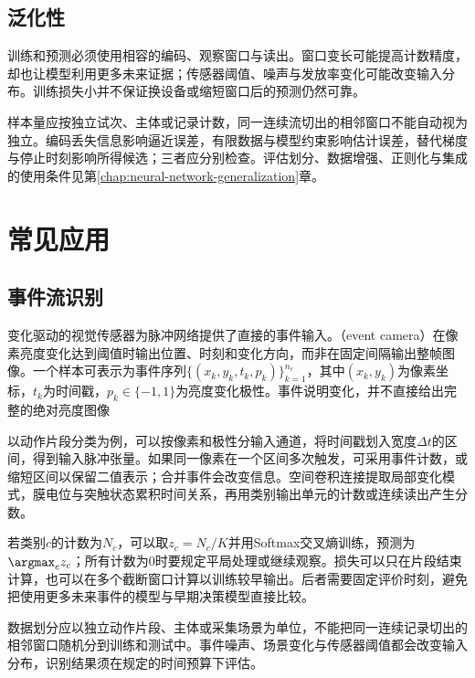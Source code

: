\subsection{泛化性}
\label{sec:snn-generalization}

训练和预测必须使用相容的编码、观察窗口与读出。窗口变长可能提高计数精度，却也让模型利用更多未来证据；传感器阈值、噪声与发放率变化可能改变输入分布。训练损失小并不保证换设备或缩短窗口后的预测仍然可靠。

样本量应按独立试次、主体或记录计数，同一连续流切出的相邻窗口不能自动视为独立。编码丢失信息影响逼近误差，有限数据与模型约束影响估计误差，替代梯度与停止时刻影响所得候选；三者应分别检查。评估划分、数据增强、正则化与集成的使用条件见第\ref{chap:neural-network-generalization}章。

\section{常见应用}
\label{sec:snn-applications}

\subsection{事件流识别}
\label{sec:snn-event-recognition}

变化驱动的视觉传感器为脉冲网络提供了直接的事件输入。（event camera）在像素亮度变化达到阈值时输出位置、时刻和变化方向，而非在固定间隔输出整帧图像。一个样本可表示为事件序列$\{(x_k,y_k,t_k,p_k)\}_{k=1}^{n_e}$，其中$(x_k,y_k)$为像素坐标，$t_k$为时间戳，$p_k\in\{-1,1\}$为亮度变化极性。事件说明变化，并不直接给出完整的绝对亮度图像

以动作片段分类为例，可以按像素和极性分输入通道，将时间戳划入宽度$\Delta t$的区间，得到输入脉冲张量。如果同一像素在一个区间多次触发，可采用事件计数，或缩短区间以保留二值表示；合并事件会改变信息。空间卷积连接提取局部变化模式，膜电位与突触状态累积时间关系，再用类别输出单元的计数或连续读出产生分数。

若类别$c$的计数为$N_c$，可以取$z_c=N_c/K$并用Softmax交叉熵训练，预测为$\argmax_c z_c$；所有计数为0时要规定平局处理或继续观察。损失可以只在片段结束计算，也可以在多个截断窗口计算以训练较早输出。后者需要固定评价时刻，避免把使用更多未来事件的模型与早期决策模型直接比较。

数据划分应以独立动作片段、主体或采集场景为单位，不能把同一连续记录切出的相邻窗口随机分到训练和测试中。事件噪声、场景变化与传感器阈值都会改变输入分布，识别结果须在规定的时间预算下评估。

